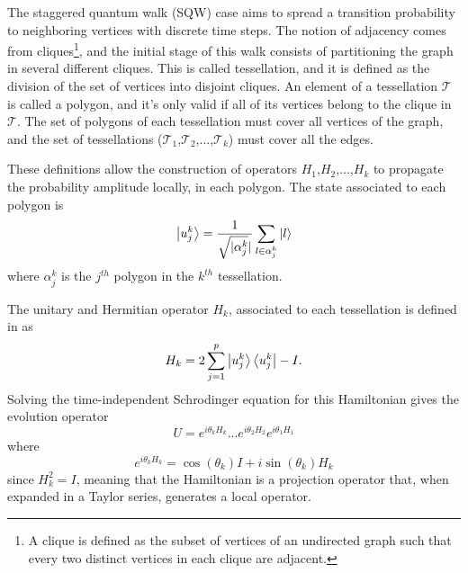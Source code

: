 \documentclass[../../dissertation.tex]{subfiles}
\begin{document}
The staggered quantum walk (SQW) case aims to spread a transition probability to
neighboring vertices with discrete time steps. The notion of adjacency comes
from cliques\footnote{A clique is defined as the subset of vertices of an
	undirected graph such that every two distinct vertices in each clique
are adjacent.}, and the initial stage of this walk consists of partitioning the
graph in several different cliques. This is called tessellation, and it is
defined as the division of the set of vertices into disjoint cliques. An
element of a tessellation $\mathscr{T}$ is called a polygon, and it's only
valid if all of its vertices belong to the clique in $\mathscr{T}$. The set
of polygons of each tessellation must cover all vertices of the graph, and the
set of tessellations
($\mathscr{T}_{1}$,$\mathscr{T}_{2}$,...,$\mathscr{T}_{k}$) must cover all the
edges.\par 

These definitions allow the construction of operators $H_1$,$H_2$,...,$H_k$ to propagate the probability amplitude locally, in each
polygon. The state associated to each polygon is
\begin{equation}
	\ket{u_{j}^{k}} = \frac{1}{\sqrt{\mathopen|\alpha_{j}^{k}}\mathclose|}\sum_{l\in\alpha_{j}^{k}}\ket{l}
\end{equation}
where $\alpha_{j}^{k}$ is the $j^{th}$ polygon in the $k^{th}$ tessellation.\par

The unitary and Hermitian operator $H_k$, associated to each tessellation is
defined in \cite{portugal2017b} as
\begin{equation}
	H_k = 2\sum_{j=1}^{p}\ket{u_{j}^{k}}\bra{u_{j}^{k}} - I.
	\label{eq:StagHamil}
\end{equation}
Solving the time-independent Schrodinger equation for this Hamiltonian gives
the evolution operator 
\begin{equation}
	U = e^{i\theta_{k}H_{k}}...e^{i\theta_{2}H_{2}}e^{i\theta_{1}H_{1}}
	\label{eq:stagWalkUnmodOp}
\end{equation}
where
\begin{equation}
	e^{i\theta_{k}H_{k}} = \cos{(\theta_k)}I + i\sin{(\theta_k)}H_k
\end{equation}
since $H_k^2 = I$, meaning that the Hamiltonian is a projection operator that,
when expanded in a Taylor series, generates a local operator.\par
\end{document}
